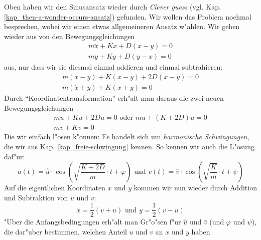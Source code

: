 Oben haben wir den Sinusansatz wieder durch \emph{Clever guess}
(vgl. Kap. \ref{kap_then-a-wonder-occurs-ansatz}) gefunden. Wir wollen
das Problem nochmal besprechen, wobei wir einen etwas allgemeineren
Ansatz w"ahlen. Wir gehen wieder aus von den Bewegungsgleichungen
\begin{equation}
   \label{eq:24}
   \begin{split}
      m \ddot x + Kx + D(x -y) = 0\\
      m \ddot y + Ky + D(y -x) = 0
   \end{split}
\end{equation}
aus, nur dass wir sie diesmal einmal addieren und einmal
subtrahieren:
\begin{equation}
   \label{eq:25}
   \begin{split}
      m (\ddot x - \ddot y) + K(x - y) + 2D(x - y) = 0 \\
      m (\ddot x + \ddot y) + K(x + y) = 0 
   \end{split}
\end{equation}
Durch "`Koordinatentransformation"'
erh"alt man daraus die zwei neuen Bewegungsgleichungen
\begin{equation}
   \label{eq:26}
   \begin{split}
      m \ddot u + Ku + 2D u = 0 \text{ oder } m \ddot u + (K + 2D)u = 0\\
      m \ddot v + Kv = 0
   \end{split}
\end{equation}
Die wir einfach l"osen k"onnen: Es handelt sich um \emph{harmonische
  Schwingungen}, die wir aus Kap. \ref{kap_freie-schwingung}
kennen. So kennen wir auch die L"osung daf"ur:
\begin{equation}
   \label{eq:27}
   u(t) = \hat u \cdot \cos(\sqrt{\frac{K+2D}{m}} \cdot t + \varphi)
   \text{ und }
v(t) = \hat v \cdot \cos(\sqrt{\frac{K}{m}}\cdot t + \psi)
\end{equation}
Auf die eigentlichen Koordinaten $x$ und $y$ kommen wir nun wieder
durch Addition und Subtraktion von $u$ und $v$:
\begin{equation}
   \label{eq:28}
   x = \frac{1}{2}(v+u) \text{ und } y = \frac{1}{2}(v-u)
\end{equation}
"Uber die Anfangsbedingungen erh"alt man Gr"o"sen f"ur $\hat u$ und $\hat
v$ (und $\varphi$ und $\psi$), die dar"uber bestimmen, welchen Anteil
$u$ und $v$ an $x$ und $y$ haben.






